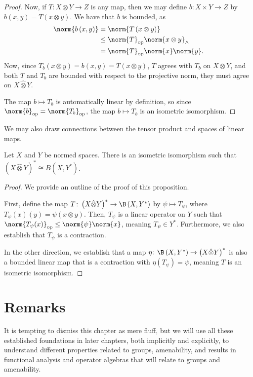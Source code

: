 \begin{proof}
  Now, if $T\colon X\otimes Y\rightarrow Z$ is any map, then we may define $b\colon X\times Y \rightarrow Z$ by $b\left( x,y \right) = T\left( x\otimes y \right)$. We have that $b$ is bounded, as
  \begin{align*}
    \norm{b\left( x,y \right)} &= \norm{T\left( x\otimes y \right)}\\
                               &\leq \norm{T}_{\op}\norm{x\otimes y}_{\wedge}\\
                               &= \norm{T}_{\op}\norm{x}\norm{y}.
  \end{align*}
  Now, since $T_b\left( x\otimes y \right) = b\left( x,y \right) = T\left( x\otimes y \right)$, $T$ agrees with $T_b$ on $X\otimes Y$, and both $T$ and $T_b$ are bounded with respect to the projective norm, they must agree on $X\hat\otimes Y$.\newline

  The map $b\mapsto T_b$ is automatically linear by definition, so since $\norm{b}_{\op} = \norm{T_b}_{\op}$, the map $b\mapsto T_b$ is an isometric isomorphism.
\end{proof}
We may also draw connections between the tensor product and spaces of linear maps.
\begin{proposition}
  Let $X$ and $Y$ be normed spaces. There is an isometric isomorphism such that $\left( X\hat\otimes Y \right)^{\ast} \cong B\left( X,Y^{\ast} \right)$.
\end{proposition}
\begin{proof}
  We provide an outline of the proof of this proposition.\newline

  First, define the map $T\colon \left( X\hat\otimes Y \right)^{\ast}\rightarrow \B\left( X,Y^{\ast} \right)$ by $\psi\mapsto T_{\psi}$, where $T_{\psi}\left( x \right)\left( y \right) = \psi\left( x\otimes y \right)$. Then, $T_{\psi}$ is a linear operator on $Y$ such that $\norm{T_{\psi}(x)}_{\op}\leq \norm{\psi}\norm{x}$, meaning $T_{\psi}\in Y^{\ast}$. Furthermore, we also establish that $T_{\psi}$ is a contraction.\newline

  In the other direction, we establish that a map $\eta\colon \B\left( X,Y^{\ast} \right)\rightarrow \left( X\hat\otimes Y \right)^{\ast}$ is also a bounded linear map that is a contraction with $\eta\left( T_{\psi} \right) = \psi$, meaning $T$ is an isometric isomorphism.
\end{proof}
\section{Remarks}%
It is tempting to dismiss this chapter as mere fluff, but we will use all these established foundations in later chapters, both implicitly and explicitly, to understand different properties related to groups, amenability, and results in functional analysis and operator algebras that will relate to groups and amenability.\newline

